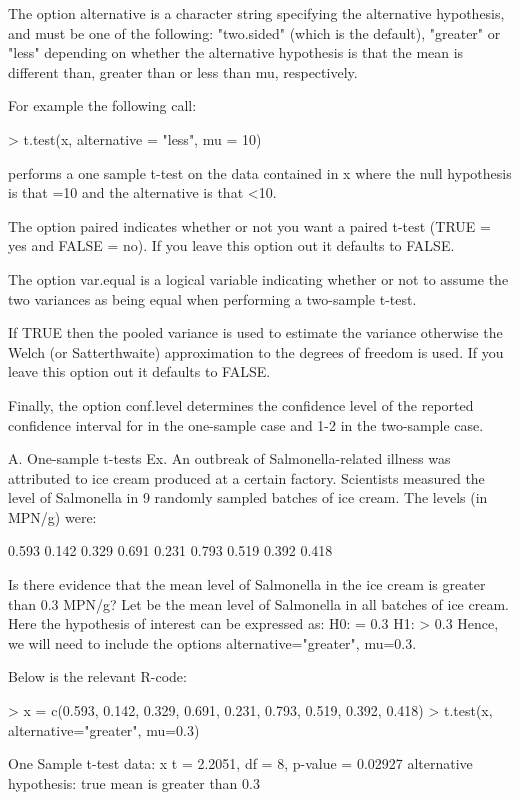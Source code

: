 The option alternative is a character string specifying the alternative hypothesis, and must be one of the following: "two.sided" (which is the default), "greater" or "less" depending on whether the alternative hypothesis is that the mean is different than, greater than or less than mu, respectively. 

For example the following call:


> t.test(x, alternative = "less", mu = 10)



performs a one sample t-test on the data contained in x where the null hypothesis is that =10 and the alternative is that <10.

The option paired indicates whether or not you want a paired t-test (TRUE = yes and FALSE = no). If you leave this option out it defaults to FALSE.

The option var.equal is a logical variable indicating whether or not to assume the two variances as being equal when performing a two-sample t-test. 


If TRUE then the pooled variance is used to estimate the variance otherwise the Welch (or Satterthwaite) approximation to the degrees of freedom is used. If you leave this option out it defaults to FALSE.

Finally, the option conf.level determines the confidence level of the reported confidence interval for in the one-sample case and 1-2 in the two-sample case.

A. One-sample t-tests
Ex. An outbreak of Salmonella-related illness was attributed to ice cream produced at a certain factory. Scientists measured the level of Salmonella in 9 randomly sampled batches of ice cream. The levels (in MPN/g) were:

0.593 0.142 0.329 0.691 0.231 0.793 0.519 0.392 0.418

Is there evidence that the mean level of Salmonella in the ice cream is greater than 0.3 MPN/g?
Let be the mean level of Salmonella in all batches of ice cream. Here the hypothesis of interest can be expressed as:
H0: = 0.3
H1: > 0.3
Hence, we will need to include the options alternative="greater", mu=0.3. 

Below is the relevant R-code:

> x = c(0.593, 0.142, 0.329, 0.691, 0.231, 0.793, 0.519, 0.392, 0.418)
> t.test(x, alternative="greater", mu=0.3)


One Sample t-test
data: x
t = 2.2051, df = 8, p-value = 0.02927
alternative hypothesis: true mean is greater than 0.3




